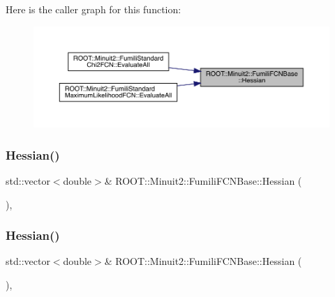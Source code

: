 Here is the caller graph for this function\+:
\nopagebreak
\begin{figure}[H]
\begin{center}
\leavevmode
\includegraphics[width=350pt]{de/dc5/classROOT_1_1Minuit2_1_1FumiliFCNBase_ac90c52050c1f7557834e3fa82c2657f3_icgraph}
\end{center}
\end{figure}
\mbox{\label{classROOT_1_1Minuit2_1_1FumiliFCNBase_ac90c52050c1f7557834e3fa82c2657f3}} 
\subsubsection{\texorpdfstring{Hessian()}{Hessian()}\hspace{0.1cm}{\footnotesize\ttfamily [5/6]}}
{\footnotesize\ttfamily std\+::vector$<$double$>$\& R\+O\+O\+T\+::\+Minuit2\+::\+Fumili\+F\+C\+N\+Base\+::\+Hessian (\begin{DoxyParamCaption}{ }\end{DoxyParamCaption})\hspace{0.3cm}{\ttfamily [inline]}, {\ttfamily [protected]}}

\mbox{\label{classROOT_1_1Minuit2_1_1FumiliFCNBase_ac90c52050c1f7557834e3fa82c2657f3}} 
\subsubsection{\texorpdfstring{Hessian()}{Hessian()}\hspace{0.1cm}{\footnotesize\ttfamily [6/6]}}
{\footnotesize\ttfamily std\+::vector$<$double$>$\& R\+O\+O\+T\+::\+Minuit2\+::\+Fumili\+F\+C\+N\+Base\+::\+Hessian (\begin{DoxyParamCaption}{ }\end{DoxyParamCaption})\hspace{0.3cm}{\ttfamily [inline]}, {\ttfamily [protected]}}

